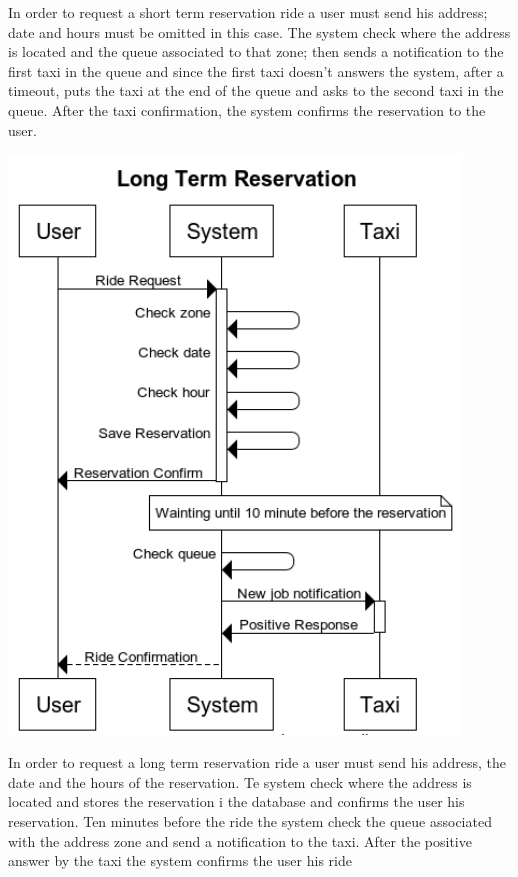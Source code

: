 	In order to request a short term reservation ride a user must send his address; date and hours must be omitted in this case. The system check where the address is located and the queue associated to that zone; then sends a notification to the first taxi in the queue and since the first taxi doesn't answers the system, after a timeout, puts the taxi at the end of the queue and asks to the second taxi in the queue. After the taxi confirmation, the system confirms the reservation to the user.
		\newpage
	\begin{center}
		\includegraphics[width=0.90\textwidth]{./images/Long_Term_Reservation}
	\end{center}
	In order to request a long term reservation ride a user must send his address, the date and the hours of the reservation. Te system check where the address is located and stores the reservation i the database and confirms the user his reservation. Ten minutes before the ride the system check the queue associated with the address zone and send a notification to the taxi. After the positive answer by the taxi the system confirms the user his ride
